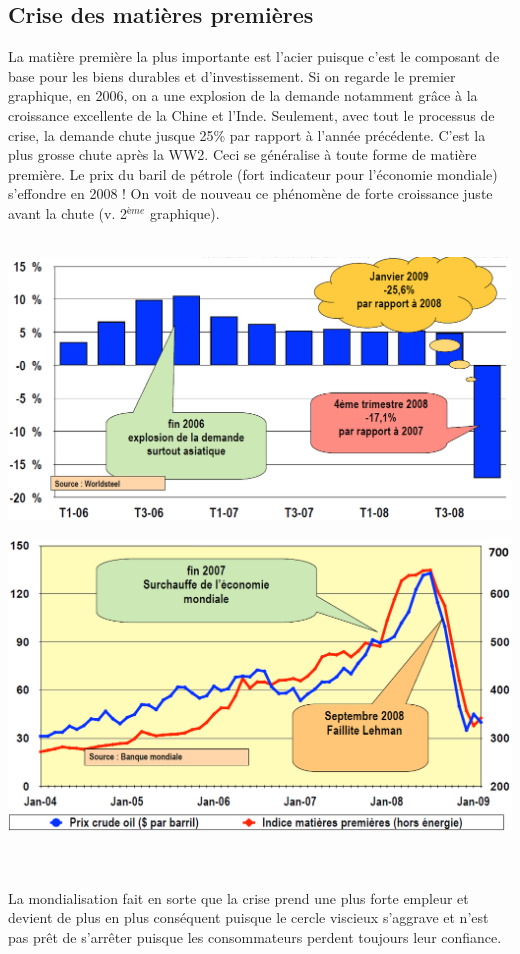 \subsection{Crise des matières premières}
La matière première la plus importante est l'acier puisque c'est le composant de base pour les biens durables et d'investissement. Si on regarde le premier graphique, en 2006, on a une explosion de la demande notamment grâce à la croissance excellente de la Chine et l'Inde. Seulement, avec tout le processus de crise, la demande chute jusque 25\% par rapport à l'année précédente. C'est la plus grosse chute après la WW2. Ceci se généralise à toute forme de matière première. Le prix du baril de pétrole (fort indicateur pour l'économie mondiale) s'effondre en 2008 ! On voit de nouveau ce phénomène de forte croissance juste avant la chute (v. 2$^{ème}$ graphique).
\\\\
\begin{minipage}{0.55\textwidth}
\begin{flushleft}
\includegraphics[scale=0.28]{20}
\end{flushleft}
\end{minipage}
\begin{minipage}{0.5\textwidth}
\begin{flushright}
\includegraphics[scale=0.3]{21}
\end{flushright}
\end{minipage}
\\\\
La mondialisation fait en sorte que la crise prend une plus forte empleur et devient de plus en plus conséquent puisque le cercle viscieux s'aggrave et n'est pas prêt de s'arrêter puisque les consommateurs perdent toujours leur confiance. 

